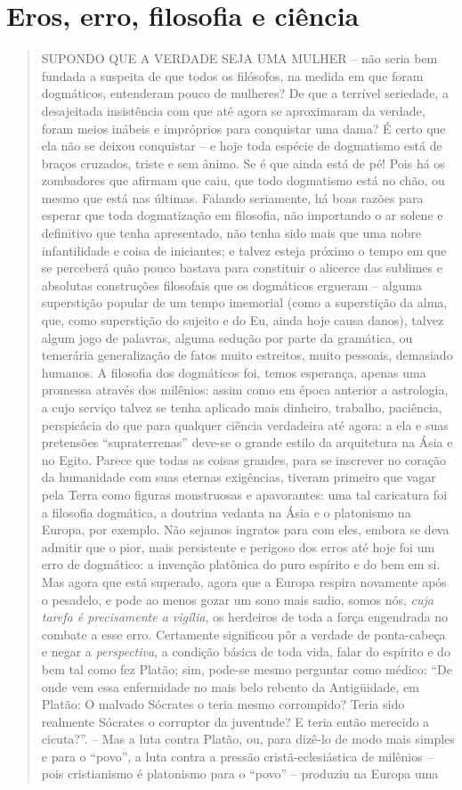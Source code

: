 \documentclass[
	12pt,				%
	openright,			%
	oneside,			%
	a4paper,			%
	english,			%
	french,				%
	spanish,			%
	brazil				%
	]{abntex2}
\begin{document}
\section{Eros, erro, filosofia e ciência}

\begin{quotation}
SUPONDO QUE A VERDADE SEJA UMA MULHER – não seria bem fundada a suspeita de que todos os filósofos, na  medida em que foram dogmáticos, entenderam pouco de mulheres? De que a terrível seriedade, a desajeitada insistência com que até agora se aproximaram da verdade, foram meios inábeis e impróprios para conquistar uma dama? É certo que ela não se deixou conquistar – e hoje toda espécie de dogmatismo está de braços cruzados, triste e sem ânimo. Se é que ainda está de pé! Pois há os zombadores que afirmam que caiu, que todo dogmatismo está no chão, ou mesmo que está nas últimas. Falando seriamente, há boas razões para esperar que toda dogmatização em filosofia, não importando o ar solene e definitivo que tenha apresentado, não tenha sido mais que uma nobre infantilidade e coisa de iniciantes; e talvez esteja próximo o tempo em que se perceberá quão pouco bastava para constituir o alicerce das sublimes e absolutas construções filosofais que os dogmáticos ergueram – alguma superstição popular de um tempo imemorial (como a superstição da alma, que, como superstição do sujeito e do Eu, ainda hoje causa danos), talvez algum jogo de palavras, alguma sedução por parte da gramática, ou temerária generalização de fatos muito estreitos, muito pessoais, demasiado humanos. A filosofia dos dogmáticos foi, temos esperança, apenas uma promessa através dos milênios: assim como em época anterior a astrologia, a cujo serviço talvez se tenha aplicado mais dinheiro, trabalho, paciência, perspicácia do que para qualquer ciência verdadeira até agora: a ela e suas pretensões “supraterrenas” deve-se o grande estilo da arquitetura na Ásia e no Egito. Parece que todas as coisas grandes, para se inscrever no coração da humanidade com suas eternas exigências, tiveram primeiro que vagar pela Terra como figuras monstruosas e apavorantes: uma tal caricatura foi a filosofia dogmática, a doutrina vedanta na Ásia e o platonismo na Europa, por exemplo. Não sejamos ingratos para com eles, embora se deva admitir que o pior, mais persistente e perigoso dos erros até hoje foi um erro de dogmático: a invenção platônica do puro espírito e do bem em si. Mas agora que está superado, agora que a Europa respira novamente após o pesadelo, e pode ao menos gozar um sono mais sadio, somos nós, \textit{cuja tarefa é precisamente a vigília}, os herdeiros de toda a força engendrada no combate a esse erro. Certamente significou pôr a verdade de ponta-cabeça e negar a \textit{perspectiva}, a condição básica de toda vida, falar do espírito e do bem tal como fez Platão; sim, pode-se mesmo perguntar como médico: “De onde vem essa enfermidade no mais belo rebento da Antigüidade, em Platão: O malvado Sócrates o teria mesmo corrompido? Teria sido realmente Sócrates o corruptor da juventude? E teria então merecido a cicuta?”. – Mas a luta contra Platão, ou, para dizê-lo de modo mais simples e para o “povo”, a luta contra a pressão cristã-eclesiástica de milênios – pois cristianismo é platonismo para o “povo” – produziu na Europa uma 
\end{quotation}
\end{document}
